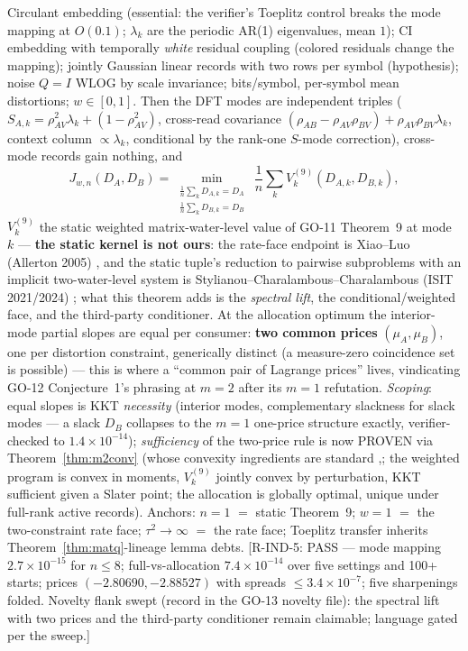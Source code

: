 ﻿\documentclass[11pt]{article}
\theoremstyle{remark}
\begin{document}
\begin{theorem}[The spectral $m=2$ theorem; settled and netted,
GO-P-2026-073]\label{thm:specm2}
Circulant embedding (essential: the verifier's Toeplitz control
breaks the mode mapping at $O(0.1)$; $\lambda_k$ are the periodic
AR(1) eigenvalues, mean $1$); CI embedding with temporally
\emph{white} residual coupling (colored residuals change the mapping);
jointly Gaussian linear records with two rows per symbol (hypothesis);
noise $Q=I$ WLOG by scale invariance; bits/symbol, per-symbol mean
distortions; $w\in[0,1]$. Then the DFT modes are independent triples
($S_{A,k}=\rho_{AV}^2\lambda_k+(1-\rho_{AV}^2)$, cross-read covariance
$(\rho_{AB}-\rho_{AV}\rho_{BV})+\rho_{AV}\rho_{BV}\lambda_k$, context
column $\propto\lambda_k$, conditional by the rank-one $S$-mode
correction), cross-mode records gain nothing, and
\[
J_{w,n}(D_A,D_B)=\min_{\substack{\frac1n\sum_kD_{A,k}=D_A\\
\frac1n\sum_kD_{B,k}=D_B}}\ \frac1n\sum_kV^{(9)}_k(D_{A,k},D_{B,k}),
\]
$V^{(9)}_k$ the static weighted matrix-water-level value of GO-11
Theorem~9 at mode $k$ --- \textbf{the static kernel is not ours}: the
rate-face endpoint is Xiao--Luo (Allerton 2005)
\cite{bib:xiaoluo2005}, and the static
tuple's reduction to pairwise subproblems with an implicit
two-water-level system is Stylianou--Charalambous--Charalambous (ISIT
2021/2024) \cite{bib:stylianou2021}; what this theorem adds is the \emph{spectral lift}, the
conditional/weighted face, and the third-party conditioner. At the
allocation optimum the interior-mode partial slopes are equal per
consumer: \textbf{two common prices} $(\mu_A,\mu_B)$, one per
distortion constraint, generically distinct (a measure-zero
coincidence set is possible) --- this is where a ``common pair of
Lagrange prices'' lives, vindicating GO-12 Conjecture~1's
phrasing at $m=2$ after its $m=1$ refutation. \emph{Scoping}: equal
slopes is KKT \emph{necessity} (interior modes, complementary
slackness for slack modes --- a slack $D_B$ collapses to the $m=1$
one-price structure exactly, verifier-checked to $1.4\times10^{-14}$);
\emph{sufficiency} of the two-price rule is now PROVEN via
Theorem~\ref{thm:m2conv} (whose convexity ingredients are standard
\cite[Sec.~3.1.7 and 3.2.4]{bib:bv04},\cite{bib:ando79}; the weighted
program is convex in moments,
$V^{(9)}_k$ jointly convex by perturbation, KKT sufficient given a
Slater point; the allocation is globally optimal, unique under
full-rank active records). Anchors: $n{=}1$ $=$
static Theorem~9; $w{=}1$ $=$ the two-constraint rate face;
$\tau^2\to\infty$ $=$ the rate face; Toeplitz transfer inherits
Theorem~\ref{thm:matq}-lineage lemma debts. [R-IND-5: PASS --- mode
mapping $2.7\times10^{-15}$ for $n\le8$; full-vs-allocation
$7.4\times10^{-14}$ over five settings and 100+ starts; prices
$(-2.80690,-2.88527)$ with spreads $\le3.4\times10^{-7}$; five
sharpenings folded. Novelty flank swept (record in the GO-13 novelty
file): the spectral lift with two prices and the third-party
conditioner remain claimable; language gated per the sweep.]
\end{theorem}
\end{document}
